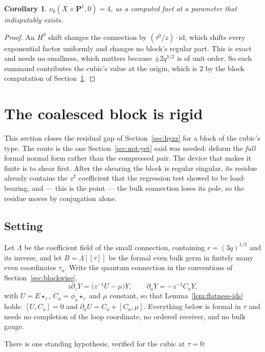 \documentclass[11pt]{article}
\newtheorem{corollary}[theorem]{Corollary}
\theoremstyle{definition}
\theoremstyle{remark}
\newcommand{\PP}{\mathbf P}
\begin{document}
\begin{corollary}
\label{cor:endpoint-value}
$\nu_6(X\times\PP^1,0)=4$, as a computed fact at a parameter that indisputably
exists.
\end{corollary}

\begin{proof}
An $H^0$ shift changes the connection by $(\tau^0/z)\cdot\mathrm{id}$, which
shifts every exponential factor uniformly and changes no block's regular part.
This is exact and needs no smallness, which matters because
$\pm2q^{1/2}$ is of unit order. So each summand contributes the cubic's value at
the origin, which is $2$ by the block computation of
Section~\ref{sec:rigid}.
\end{proof}


\section{The coalesced block is rigid}
\label{sec:rigid}

This section closes the residual gap of Section~\ref{sec:hyzz} for a block of
the cubic's type. The route is the one Section~\ref{sec:not-yet} said was
needed: deform the \emph{full} formal normal form rather than the compressed
pair. The device that makes it finite is to shear first. After the shearing the
block is regular singular, its residue already contains the $z^2$ coefficient
that the regression test showed to be load-bearing, and --- this is the point
--- the bulk connection loses its pole, so the residue moves by conjugation
alone.

\subsection*{Setting}

Let $\Lambda$ be the coefficient field of the small connection, containing
$r=(3q)^{1/2}$ and its inverse, and let $B=\Lambda[[\tau]]$ be the formal even
bulk germ in finitely many even coordinates $\tau_a$. Write the quantum
connection in the conventions of Section~\ref{sec:blockwise},
\[
  z\partial_zY=\bigl(z^{-1}U-\mu\bigr)Y,
  \qquad
  \partial_aY=-z^{-1}C_aY,
\]
with $U=E\star_\tau$, $C_a=\phi_a\star_\tau$ and $\mu$ constant, so that
Lemma~\ref{lem:flatness-ids} holds: $[U,C_a]=0$ and
$\partial_aU=C_a+[C_a,\mu]$. Everything below is formal in $\tau$ and needs no
completion of the loop coordinate, no ordered receiver, and no bulk gauge.

There is one standing hypothesis, verified for the cubic at $\tau=0$:
\end{document}
